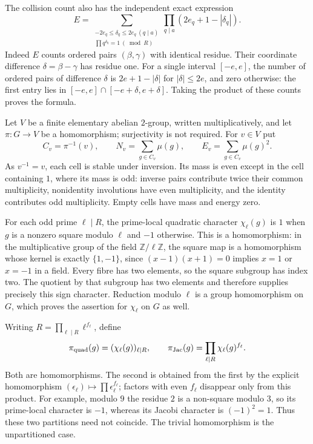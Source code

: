 The collision count also has the independent exact expression
\[
 E=\sum_{\substack{-2e_q\leq\delta_q\leq2e_q\ (q\mid a)\\
                  \prod q^{\delta_q}=1\ (\bmod R)}}
       \prod_{q\mid a}(2e_q+1-|\delta_q|).
\]
Indeed $E$ counts ordered pairs $(\beta,\gamma)$ with identical residue.
Their coordinate difference $\delta=\beta-\gamma$ has residue one.
For a single interval $[-e,e]$, the number of ordered pairs of difference
$\delta$ is $2e+1-|\delta|$ for $|\delta|\leq2e$, and zero otherwise:
the first entry lies in $[-e,e]\cap[-e+\delta,e+\delta]$.
Taking the product of these counts proves the formula.

Let $V$ be a finite elementary abelian $2$-group, written
multiplicatively, and let $\pi:G\to V$ be a homomorphism; surjectivity
is not required. For $v\in V$ put
\[
 C_v=\pi^{-1}(v),\qquad
 N_v=\sum_{g\in C_v}\mu(g),\qquad
 E_v=\sum_{g\in C_v}\mu(g)^2.
\]
As $v^{-1}=v$, each cell is stable under inversion. Its mass is even
except in the cell containing $1$, where its mass is odd: inverse pairs
contribute twice their common multiplicity, nonidentity involutions have
even multiplicity, and the identity contributes odd multiplicity.
Empty cells have mass and energy zero.

For each odd prime $\ell\mid R$, the prime-local quadratic character
$\chi_\ell(g)$ is $1$ when $g$ is a nonzero square modulo $\ell$ and
$-1$ otherwise. This is a homomorphism: in the multiplicative group of
the field $\mathbb Z/\ell\mathbb Z$, the square map is a homomorphism
whose kernel is exactly $\{1,-1\}$, since
$(x-1)(x+1)=0$ implies $x=1$ or $x=-1$ in a field. Every fibre has
two elements, so the square subgroup has index two. The quotient by
that subgroup has two elements and therefore supplies precisely this
sign character. Reduction modulo $\ell$ is a group homomorphism on $G$,
which proves the assertion for $\chi_\ell$ on $G$ as well.

Writing $R=\prod_{\ell\mid R}\ell^{f_\ell}$, define
\[
 \pi_{\rm quad}(g)=(\chi_\ell(g))_{\ell\mid R},\qquad
 \pi_{\rm Jac}(g)=\prod_{\ell\mid R}\chi_\ell(g)^{f_\ell}.
\]
Both are homomorphisms. The second is obtained from the first by the
explicit homomorphism $(\epsilon_\ell)\mapsto
\prod\epsilon_\ell^{f_\ell}$; factors with even $f_\ell$ disappear only
from this product. For example, modulo $9$ the residue $2$ is a
non-square modulo $3$, so its prime-local character is $-1$, whereas
its Jacobi character is $(-1)^2=1$. Thus these two partitions need
not coincide. The trivial homomorphism is the unpartitioned case.


